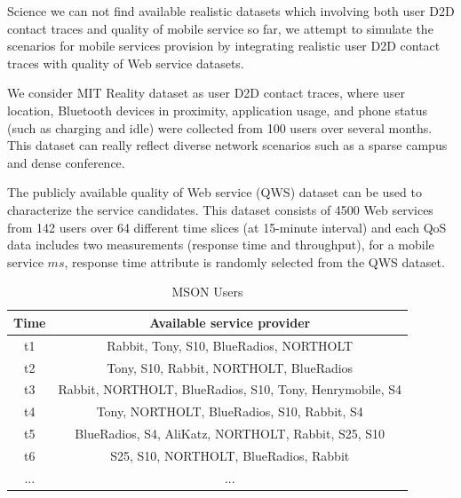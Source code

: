 \documentclass[10pt,journal,compsoc]{IEEEtran}
\begin{document}
Science we can not find available realistic datasets which involving both user D2D contact traces and quality of mobile service so far, we attempt to simulate the scenarios for mobile services provision by integrating realistic user D2D contact traces with quality of Web service datasets. 

We consider MIT Reality dataset as user D2D contact traces, where user location, Bluetooth devices in proximity, application usage, and phone status (such as charging and idle) were collected from 100 users over several months. This dataset can really reflect diverse network scenarios such as a sparse campus and dense conference.

The publicly available quality of Web service (QWS) dataset\cite{zheng2014investigating} can be used to characterize the service candidates. This dataset consists of 4500 Web services from 142 users over 64 different time slices (at 15-minute interval) and each QoS data includes two measurements (response time and throughput), for a mobile service $ms$, response time attribute is randomly selected from the QWS dataset. 

\begin{table}[!t]
\renewcommand{\arraystretch}{1.3}
\caption{MSON Users}
\label{table_example}
\centering
\begin{tabular}{|c||c|}
\hline
\bfseries Time & \bfseries Available service provider\\
\hline
\hline
t1 & Rabbit, Tony, S10, BlueRadios, NORTHOLT\\
\hline
t2 & Tony, S10, Rabbit, NORTHOLT, BlueRadios\\
\hline
t3 & Rabbit, NORTHOLT, BlueRadios, S10, Tony, Henrymobile, S4 \\
\hline
t4 & Tony, NORTHOLT, BlueRadios, S10, Rabbit, S4\\
\hline
t5 & BlueRadios, S4, AliKatz, NORTHOLT, Rabbit, S25, S10\\
\hline
t6 & S25, S10, NORTHOLT, BlueRadios, Rabbit\\
\hline
... & ...\\
\hline
\end{tabular}
\end{table}
\end{document}
